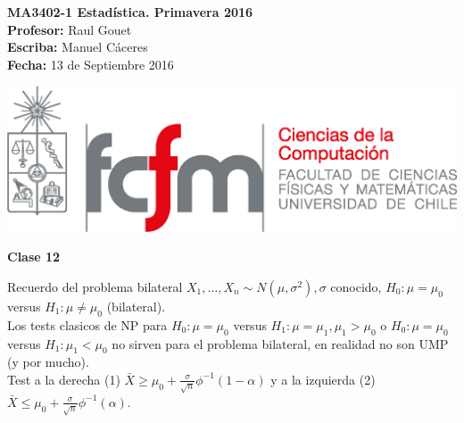 \documentclass[10pt]{article}
\theoremstyle{plain}
\theoremstyle{definition}
\newcommand{\catnum}{12} %
\newcommand{\fecha}{13 de Septiembre 2016 }
\begin{document}
\vspace*{-1.2 cm}
\begin{minipage}{0.6\textwidth}
\begin{flushleft}
\hspace*{-0.5cm}\textbf{MA3402-1 Estadística. Primavera 2016}\\
\hspace*{-0.5cm}\textbf{Profesor:} Raul Gouet\\
\hspace*{-0.5cm}\textbf{Escriba:} Manuel Cáceres\\
\hspace*{-0.5cm}\textbf{Fecha:} \fecha
\end{flushleft}
\end{minipage}
\begin{minipage}{0.36\textwidth}
\begin{flushright}
\includegraphics[scale=0.3]{imagenes/fcfm_dcc}
\end{flushright}
\end{minipage}
\bigskip

\begin{center}
\LARGE\textbf{Clase \catnum}
\end{center}
Recuerdo del problema bilateral $X_{1},\ldots,X_{n} \sim N(\mu,\sigma^2), \sigma$ conocido, $H_{0}: \mu=\mu_{0}$ versus $H_{1}: \mu \not = \mu_{0}$ (bilateral).\\

Los tests clasicos de NP para $H_{0}: \mu=\mu_{0}$ versus $H_{1}: \mu=\mu_{1}, \mu_{1}>\mu_{0}$ o $H_{0}: \mu=\mu_{0}$ versus $H_{1}: \mu_{1}<\mu_{0}$ no sirven para el problema bilateral, en realidad no son UMP (y por mucho).\\

Test a la derecha (1) $\bar{X} \ge \mu_{0} + \frac{\sigma}{\sqrt{n}}\phi^{-1}(1-\alpha)$ y a la izquierda (2) $\bar{X} \le \mu_{0} + \frac{\sigma}{\sqrt{n}}\phi^{-1}(\alpha)$.\\
\end{document}
